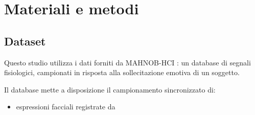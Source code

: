 \section{Materiali e metodi}

\subsection{Dataset}

Questo studio utilizza i dati forniti da MAHNOB-HCI \cite{soleymani2011multimodal}: un database di segnali fisiologici, campionati in risposta alla sollecitazione emotiva di un soggetto.

Il database mette a disposizione il campionamento sincronizzato di:

\begin{itemize}
	\item espressioni facciali registrate da
\end{itemize}
